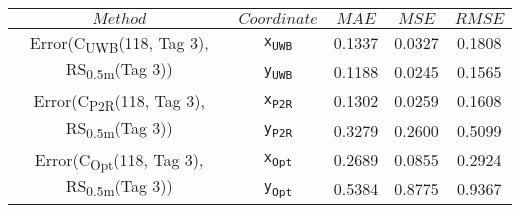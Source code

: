 \begin{table}[h]
\centering
\begin{tabular}{|c|c|c|c|c|}
\hline
$Method$ & $Coordinate$ & $MAE$ & $MSE$ & $RMSE$ \\
\hline
\multirow{2}{*}{{\footnotesize Error(C\textsubscript{UWB}(118, Tag 3), RS\textsubscript{0.5m}(Tag 3))}} & \texttt{x\textsubscript{UWB}} & 0.1337 & 0.0327 & 0.1808 \\
& \texttt{y\textsubscript{UWB}} & 0.1188 & 0.0245 & 0.1565 \\
\hline
\multirow{2}{*}{{\footnotesize Error(C\textsubscript{P2R}(118, Tag 3), RS\textsubscript{0.5m}(Tag 3))}} & \texttt{x\textsubscript{P2R}} & 0.1302 & 0.0259 & 0.1608 \\
& \texttt{y\textsubscript{P2R}} & 0.3279 & 0.2600 & 0.5099 \\
\hline
\multirow{2}{*}{{\footnotesize Error(C\textsubscript{Opt}(118, Tag 3), RS\textsubscript{0.5m}(Tag 3))}} & \texttt{x\textsubscript{Opt}} & 0.2689 & 0.0855 & 0.2924 \\
& \texttt{y\textsubscript{Opt}} & 0.5384 & 0.8775 & 0.9367 \\
\hline
\end{tabular}
\end{table}
